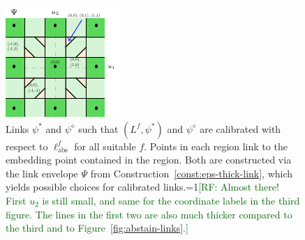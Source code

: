 \documentclass[11pt]{article}
\newcommand{\Comments}{1}
\newcommand{\mynote}[2]{\ifnum\Comments=1\textcolor{#1}{#2}\fi}
\newcommand{\raf}[1]{\mynote{darkgreen}{[RF: #1]}}
\newcommand{\jessie}[1]{\mynote{teal}{[JF: #1]}}
\newcommand{\ellabs}{\ell_{\text{abs}}^f}
\begin{document}
\begin{figure}
\begin{center}
\begin{minipage}{0.32\linewidth}
		\end{minipage}\hfill
		\begin{minipage}{0.32\linewidth}
		\includegraphics[width=\linewidth]{tikz/lovasz-link-envelope.pdf}
		\end{minipage}\hfill
		\caption{Links $\psi^*$ and $\psi^\diamond$ such that $(L^f, \psi^*)$ and $\psi^\diamond$ are calibrated with respect to $\ellabs$ for all suitable $f$. Points in each region link to the embedding point contained in the region. Both are constructed via the link envelope $\Psi$ from Construction~\ref{const:eps-thick-link}, which yields possible choices for calibrated links.\raf{Almost there!  First $u_2$ is still small, and same for the coordinate labels in the third figure.  The lines in the first two are also much thicker compared to the third and to Figure~\ref{fig:abstain-links}.}
			}
		\label{fig:lovasz-links}
	\end{center}
\end{figure}
\end{document}
